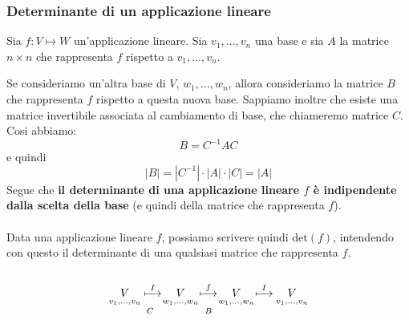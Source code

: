 \documentclass[italian]{article}
\newcommand\x{\times}
\renewcommand{\det}[1]{\text{det$\left(#1\right)$}}
\begin{document}
\subsubsection{Determinante di un applicazione lineare}
Sia $f: V \longmapsto W$ un'applicazione lineare. Sia $v_1,...,v_n$ una base e sia $A$ la matrice $n \x n$ che rappresenta $f$ rispetto a $v_1,...,v_n$.

Se consideriamo un'altra base di $V$, $w_1,...,w_n$, allora consideriamo la matrice $B$ che rappresenta $f$ rispetto a questa nuova base. Sappiamo inoltre che esiste una matrice invertibile associata al cambiamento di base, che chiameremo matrice $C$. 
Cosi abbiamo:
\[
	B = C^{-1}AC
\]
e quindi 
\[
	|B| = |C^{-1}|\cdot |A| \cdot |C| = |A|
\]
Segue che \textbf{il determinante di una applicazione lineare $f$ è indipendente dalla scelta della base} (e quindi della matrice che rappresenta $f$).\\\\
Data una applicazione lineare $f$, possiamo scrivere quindi $\det{f}$, intendendo con questo il determinante di una qualsiasi matrice che rappresenta $f$.\\\\
\[
	\underset{\mathrlap{C}}{
		\underset{\mathclap{v_1,...,v_n}}{V} \quad \overset{I}{\longmapsto} \quad
	}   
	\underset{\mathclap{B}}{
		\underset{\mathclap{w_1,...,w_n}}{V}
		 \quad \overset{f}{\longmapsto} \quad \underset{\mathclap{w_1,...,w_n}}{V}
	}
	 \quad \overset{I}{\longmapsto} \quad  \underset{\mathclap{v_1,...,v_n}}{V}
\]
\end{document}

